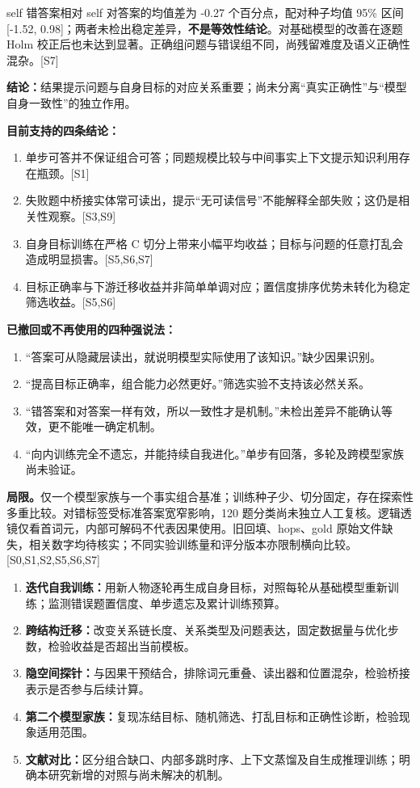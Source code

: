 \documentclass[11pt,a4paper]{article}
\newcommand{\src}[1]{{\scriptsize\color{ink}[#1]}}
\newcommand{\con}[1]{\par\noindent\textbf{结论：}#1\par}
\newcommand{\sub}[1]{\par\medskip\noindent{\large\bfseries\color{ink}#1}\par\smallskip}
\begin{document}
self 错答案相对 self 对答案的均值差为 -0.27 个百分点，配对种子均值 95\% 区间 [-1.52, 0.98]；两者未检出稳定差异，\textbf{不是等效性结论}。对基础模型的改善在逐题 Holm 校正后也未达到显著。正确组问题与错误组不同，尚残留难度及语义正确性混杂。\src{S7}
\con{结果提示问题与自身目标的对应关系重要；尚未分离“真实正确性”与“模型自身一致性”的独立作用。}
\newpage
\sub{6\quad 讨论：结论、撤回与局限}
\textbf{目前支持的四条结论：}
\begin{enumerate}
\item 单步可答并不保证组合可答；同题规模比较与中间事实上下文提示知识利用存在瓶颈。\src{S1}
\item 失败题中桥接实体常可读出，提示“无可读信号”不能解释全部失败；这仍是相关性观察。\src{S3,S9}
\item 自身目标训练在严格 C 切分上带来小幅平均收益；目标与问题的任意打乱会造成明显损害。\src{S5,S6,S7}
\item 目标正确率与下游迁移收益并非简单单调对应；置信度排序优势未转化为稳定筛选收益。\src{S5,S6}
\end{enumerate}
\textbf{已撤回或不再使用的四种强说法：}
\begin{enumerate}
\item “答案可从隐藏层读出，就说明模型实际使用了该知识。”缺少因果识别。
\item “提高目标正确率，组合能力必然更好。”筛选实验不支持该必然关系。
\item “错答案和对答案一样有效，所以一致性才是机制。”未检出差异不能确认等效，更不能唯一确定机制。
\item “向内训练完全不遗忘，并能持续自我进化。”单步有回落，多轮及跨模型家族尚未验证。
\end{enumerate}
\textbf{局限。}仅一个模型家族与一个事实组合基准；训练种子少、切分固定，存在探索性多重比较。对错标签受标准答案宽窄影响，120 题分类尚未独立人工复核。逻辑透镜仅看首词元，内部可解码不代表因果使用。旧回填、hops、gold 原始文件缺失，相关数字均待核实；不同实验训练量和评分版本亦限制横向比较。\src{S0,S1,S2,S5,S6,S7}
\sub{7\quad 下一步研究}
\begin{enumerate}
\item \textbf{迭代自我训练：}用新人物逐轮再生成自身目标，对照每轮从基础模型重新训练；监测错误题置信度、单步遗忘及累计训练预算。
\item \textbf{跨结构迁移：}改变关系链长度、关系类型及问题表达，固定数据量与优化步数，检验收益是否超出当前模板。
\item \textbf{隐空间探针：}与因果干预结合，排除词元重叠、读出器和位置混杂，检验桥接表示是否参与后续计算。
\item \textbf{第二个模型家族：}复现冻结目标、随机筛选、打乱目标和正确性诊断，检验现象适用范围。
\item \textbf{文献对比：}区分组合缺口、内部多跳时序、上下文蒸馏及自生成推理训练；明确本研究新增的对照与尚未解决的机制。
\end{enumerate}
\end{document}
